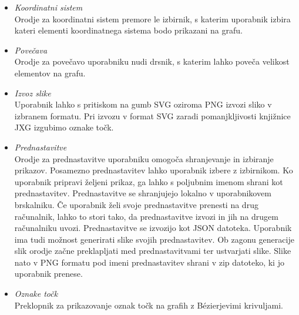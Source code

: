 \documentclass[isrm2, tisk]{fmfdelo}
\begin{document}
    \begin{itemize}
        \item {\it Koordinatni sistem}\\
        Orodje za koordinatni sistem premore le izbirnik, s katerim uporabnik izbira kateri elementi koordinatnega sistema bodo prikazani na grafu.
        \item {\it Povečava}\\
        Orodje za povečavo uporabniku nudi drsnik, s katerim lahko poveča velikost elementov na grafu.
        \item {\it Izvoz slike} \\
        Uporabnik lahko s pritiskom na gumb SVG oziroma PNG izvozi sliko v izbranem formatu.
        Pri izvozu v format SVG zaradi pomanjkljivosti knjižnice JXG izgubimo oznake točk.
        \item {\it Prednastavitve} \\
        Orodje za prednastavitve uporabniku omogoča shranjevanje in izbiranje prikazov.
        Posamezno prednastavitev lahko uporabnik izbere z izbirnikom.
        Ko uporabnik pripravi željeni prikaz, ga lahko s poljubnim imenom shrani kot prednastavitev.
        Prednastavitve se shranjujejo lokalno v uporabnikovem brskalniku.
        Če uporabnik želi svoje prednastavitve prenesti na drug računalnik, lahko to stori tako, da prednastavitve izvozi in jih na drugem računalniku uvozi.
        Prednastavitve se izvozijo kot JSON datoteka.
        Uporabnik ima tudi možnost generirati slike svojih prednastavitev.
        Ob zagonu generacije slik orodje začne preklapljati med prednastavitvami ter ustvarjati slike.
        Slike nato v PNG formatu pod imeni prednastavitev shrani v zip datoteko, ki jo uporabnik prenese.
        \item {\it Oznake točk}\\
        Preklopnik za prikazovanje oznak točk na grafih z Bézierjevimi krivuljami.
    \end{itemize}
\end{document}

